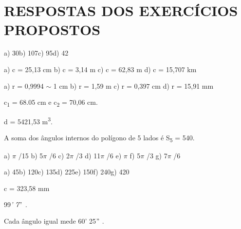 \section{RESPOSTAS DOS EXERCÍCIOS PROPOSTOS}

\begin{respostas}{2}
\ansitem{} a) 30\degree    b) 107\degree    c) 95\degree    d) 42\degree

\ansitem{} a) c = 25,13 cm \tab  b) c = 3,14 m \tab  \tab c) c = 62,83 m \tab d) c = 15,707 km

\ansitem{} a) r = 0,9994 $ \sim $  1 cm   b)  r = 1,59 m \tab c)  r = 0,397 cm  \tab d) r = 15,91 mm

\ansitem{} c\textsubscript{1} = 68.05 cm e c\textsubscript{2} = 70,06 cm.

\ansitem{} d = 5421,53 m\textsuperscript{3}.

\ansitem{}  A soma dos ângulos internos do polígono de 5 lados é S\textsubscript{5} = 540\degree.   

\ansitem{} a) $ \pi $ /15 \tab b) 5$ \pi $ /6    \tab c) 2$ \pi $ /3   \tab d) 11$ \pi $ /6      \tab e) $ \pi $      f) 5$ \pi $ /3      \tab g) 7$ \pi $ /6  

\ansitem{} a) 45\degree \tab b) 120\degree \tab c) 135\degree \tab d) 225\degree \tab e) 150\degree     f) 240\degree \tab g) 420\degree

\ansitem{} c = 323,58 mm

\ansitem{}   99\textit{’ 7$"$  . }

\ansitem{} Cada ângulo igual mede 60’ 25$"$ .

\ansitem{}


\end{respostas}
